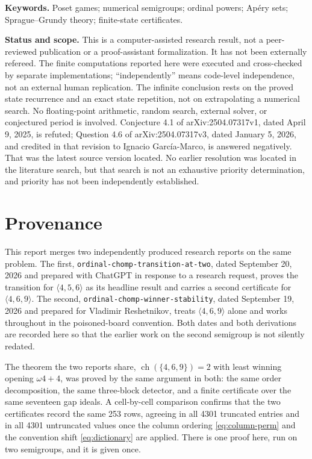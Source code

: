 \documentclass[11pt,letterpaper]{article}
\numberwithin{equation}{section}
\theoremstyle{definition}
\theoremstyle{remark}
\newcommand{\ch}{\operatorname{ch}}
\begin{document}
\begin{titlepage}
\vspace{2pt}
\noindent\textbf{Keywords.} Poset games; numerical semigroups; ordinal
powers; Ap\'ery sets; Sprague--Grundy theory; finite-state certificates.
\vfill
\begin{tcolorbox}
\textbf{Status and scope.} This is a computer-assisted research result,
not a peer-reviewed publication or a proof-assistant formalization. It has
not been externally refereed. The finite computations reported here were
executed and cross-checked by separate implementations; ``independently''
means code-level independence, not an external human replication. The
infinite conclusion rests on the proved state recurrence and an exact
state repetition, not on extrapolating a numerical search. No
floating-point arithmetic, random search, external solver, or conjectured
period is involved. Conjecture 4.1 of arXiv:2504.07317v1, dated April 9,
2025, is refuted; Question 4.6 of arXiv:2504.07317v3, dated January 5,
2026, and credited in that revision to Ignacio Garc\'ia-Marco, is answered
negatively. That was the latest source version located. No earlier
resolution was located in the literature search, but that search is not an
exhaustive priority determination, and priority has not been independently
established.
\end{tcolorbox}
\end{titlepage}

\begingroup
\small
\setlength{\parskip}{0pt}
\tableofcontents
\endgroup
\newpage

\section*{Provenance}

This report merges two independently produced research reports on the same
problem. The first, \texttt{ordinal-chomp-transition-at-two}, dated
September 20, 2026 and prepared with ChatGPT in response to a research
request, proves the transition for $\langle4,5,6\rangle$ as its headline
result and carries a second certificate for $\langle4,6,9\rangle$. The
second, \texttt{ordinal-chomp-winner-stability}, dated September 19, 2026
and prepared for Vladimir Reshetnikov, treats $\langle4,6,9\rangle$ alone
and works throughout in the poisoned-board convention. Both dates and both
derivations are recorded here so that the earlier work on the second
semigroup is not silently redated.

The theorem the two reports share, $\ch(\{4,6,9\})=2$ with least winning
opening $\omega4+4$, was proved by the same argument in both: the same
order decomposition, the same three-block detector, and a finite
certificate over the same seventeen gap ideals. A cell-by-cell comparison
confirms that the two certificates record the same 253 rows, agreeing in
all 4301 truncated entries and in all 4301 untruncated values once the
column ordering \cref{eq:column-perm} and the convention shift
\cref{eq:dictionary} are applied. There is one proof here, run on two
semigroups, and it is given once.
\end{document}
